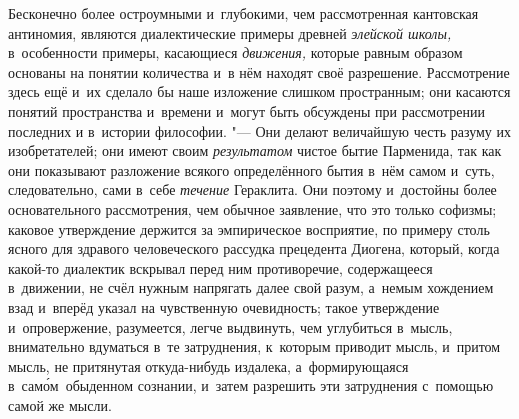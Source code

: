 Бесконечно более остроумными и~глубокими, чем рассмотренная кантовская
антиномия, являются диалектические примеры древней {\em элейской школы,}
в~особенности примеры, касающиеся {\em движения,} которые равным образом основаны
на понятии количества и~в нём находят своё разрешение. Рассмотрение здесь
ещё и~их сделало бы наше изложение слишком пространным; они касаются понятий
пространства и~времени и~могут быть обсуждены при рассмотрении последних и
в~истории философии. "--- Они делают величайшую честь разуму их изобретателей;
они имеют своим {\em результатом} чистое бытие Парменида, так как они
показывают разложение всякого определённого бытия в~нём самом и~суть,
следовательно, сами в~себе {\em течение} Гераклита. Они поэтому и~достойны
более основательного рассмотрения, чем обычное заявление, что это только
софизмы; каковое утверждение держится за эмпирическое восприятие, по примеру
столь ясного для здравого человеческого рассудка прецедента Диогена, который,
когда какой-то диалектик вскрывал перед ним противоречие, содержащееся
в~движении, не счёл нужным напрягать далее свой разум, а~немым хождением взад
и~вперёд указал на чувственную очевидность; такое утверждение и~опровержение,
разумеется, легче выдвинуть, чем углубиться в~мысль, внимательно вдуматься
в~те затруднения, к~которым приводит мысль, и~притом мысль, не притянутая
откуда-нибудь издалека, а~формирующаяся в~сам\'{о}м~обыденном сознании,
и~затем разрешить эти затруднения с~помощью самой же мысли.

